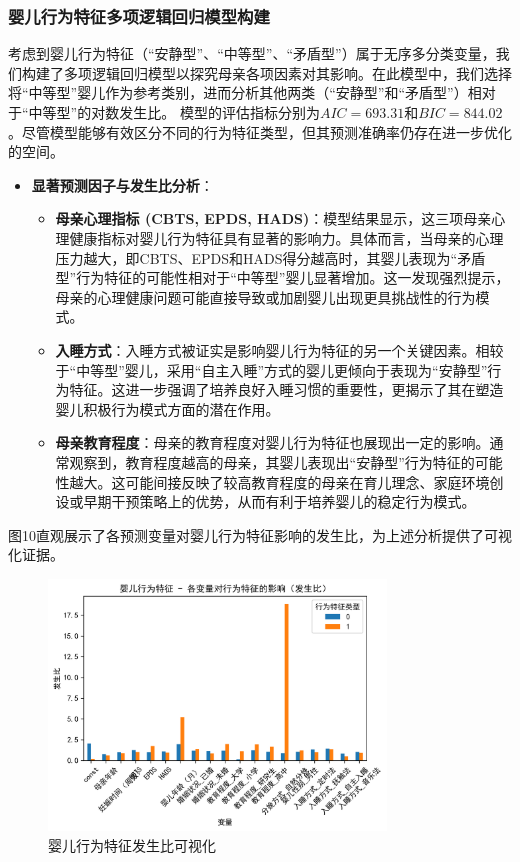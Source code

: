 \documentclass[withoutpreface,bwprint]{cumcmthesis}
\begin{document}
\subsubsection{婴儿行为特征多项逻辑回归模型构建}
考虑到婴儿行为特征（“安静型”、“中等型”、“矛盾型”）属于无序多分类变量，我们构建了多项逻辑回归模型以探究母亲各项因素对其影响。在此模型中，我们选择将“中等型”婴儿作为参考类别，进而分析其他两类（“安静型”和“矛盾型”）相对于“中等型”的对数发生比。
模型的评估指标分别为$AIC = 693.31$和$BIC = 844.02$。尽管模型能够有效区分不同的行为特征类型，但其预测准确率仍存在进一步优化的空间。
\begin{itemize}
    \item \textbf{显著预测因子与发生比分析}：
    \begin{itemize}
        \item \textbf{母亲心理指标 (CBTS, EPDS, HADS)}：模型结果显示，这三项母亲心理健康指标对婴儿行为特征具有显著的影响力。具体而言，当母亲的心理压力越大，即CBTS、EPDS和HADS得分越高时，其婴儿表现为“矛盾型”行为特征的可能性相对于“中等型”婴儿显著增加。这一发现强烈提示，母亲的心理健康问题可能直接导致或加剧婴儿出现更具挑战性的行为模式。
        \item \textbf{入睡方式}：入睡方式被证实是影响婴儿行为特征的另一个关键因素。相较于“中等型”婴儿，采用“自主入睡”方式的婴儿更倾向于表现为“安静型”行为特征。这进一步强调了培养良好入睡习惯的重要性，更揭示了其在塑造婴儿积极行为模式方面的潜在作用。
        \item \textbf{母亲教育程度}：母亲的教育程度对婴儿行为特征也展现出一定的影响。通常观察到，教育程度越高的母亲，其婴儿表现出“安静型”行为特征的可能性越大。这可能间接反映了较高教育程度的母亲在育儿理念、家庭环境创设或早期干预策略上的优势，从而有利于培养婴儿的稳定行为模式。
    \end{itemize}
\end{itemize}
图10直观展示了各预测变量对婴儿行为特征影响的发生比，为上述分析提供了可视化证据。

\begin{figure}[htbp]
    \centering
    \includegraphics[width=0.8\textwidth]{figures/婴儿行为特征_odds_ratios.png} %
    \caption{婴儿行为特征发生比可视化}
    \label{fig:baby_behavior_odds_ratios}
\end{figure}
\end{document}
